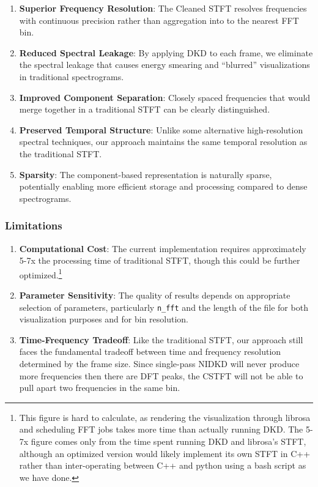 \documentclass[11pt,twoside]{report}
\numberwithin{thm}{section}
\numberwithin{equation}{section}
\begin{document}
\begin{enumerate}
    \item \textbf{Superior Frequency Resolution}: The Cleaned STFT resolves frequencies with continuous precision rather than aggregation into to the nearest FFT bin.
    
    \item \textbf{Reduced Spectral Leakage}: By applying DKD to each frame, we eliminate the spectral leakage that causes energy smearing and ``blurred'' visualizations in traditional spectrograms.
    
    \item \textbf{Improved Component Separation}: Closely spaced frequencies that would merge together in a traditional STFT can be clearly distinguished.
    
    \item \textbf{Preserved Temporal Structure}: Unlike some alternative high-resolution spectral techniques, our approach maintains the same temporal resolution as the traditional STFT.
    
    \item \textbf{Sparsity}: The component-based representation is naturally sparse, potentially enabling more efficient storage and processing compared to dense spectrograms.
\end{enumerate}

\subsubsection{Limitations}

\begin{enumerate}
    \item \textbf{Computational Cost}: The current implementation requires approximately 5-7x the processing time of traditional STFT, though this could be further optimized.\footnote{This figure is hard to calculate, as rendering the visualization through librosa and scheduling FFT jobs takes more time than actually running DKD. The 5-7x figure comes only from the time spent running DKD and librosa's STFT, although an optimized version would likely implement its own STFT in C++ rather than inter-operating between C++ and python using a bash script as we have done.}
    
    \item \textbf{Parameter Sensitivity}: The quality of results depends on appropriate selection of parameters, particularly \texttt{n\_fft} and the length of the file for both visualization purposes and for bin resolution.
    
    \item \textbf{Time-Frequency Tradeoff}: Like the traditional STFT, our approach still faces the fundamental tradeoff between time and frequency resolution determined by the frame size. Since single-pass NIDKD will never produce more frequencies then there are DFT peaks, the CSTFT will not be able to pull apart two frequencies in the same bin.
\end{enumerate}
\clearpage
\end{document}
